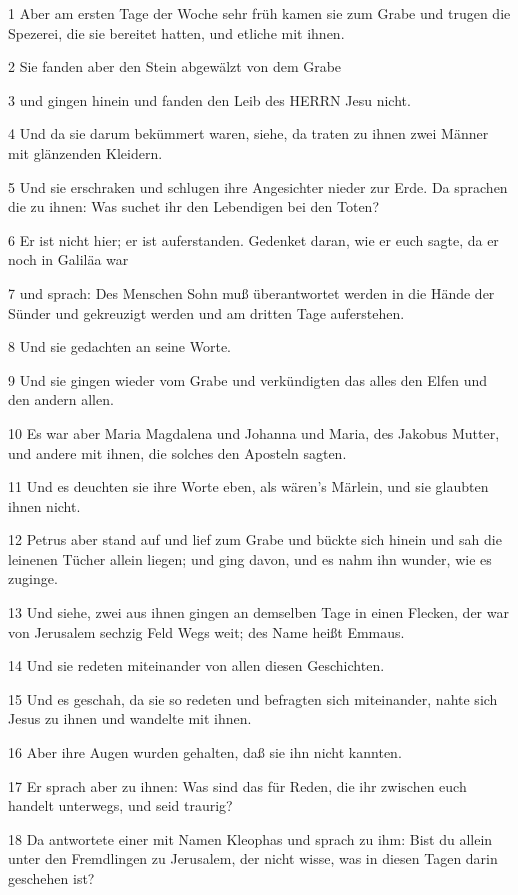 \par 1 Aber am ersten Tage der Woche sehr früh kamen sie zum Grabe und trugen die Spezerei, die sie bereitet hatten, und etliche mit ihnen.
\par 2 Sie fanden aber den Stein abgewälzt von dem Grabe
\par 3 und gingen hinein und fanden den Leib des HERRN Jesu nicht.
\par 4 Und da sie darum bekümmert waren, siehe, da traten zu ihnen zwei Männer mit glänzenden Kleidern.
\par 5 Und sie erschraken und schlugen ihre Angesichter nieder zur Erde. Da sprachen die zu ihnen: Was suchet ihr den Lebendigen bei den Toten?
\par 6 Er ist nicht hier; er ist auferstanden. Gedenket daran, wie er euch sagte, da er noch in Galiläa war
\par 7 und sprach: Des Menschen Sohn muß überantwortet werden in die Hände der Sünder und gekreuzigt werden und am dritten Tage auferstehen.
\par 8 Und sie gedachten an seine Worte.
\par 9 Und sie gingen wieder vom Grabe und verkündigten das alles den Elfen und den andern allen.
\par 10 Es war aber Maria Magdalena und Johanna und Maria, des Jakobus Mutter, und andere mit ihnen, die solches den Aposteln sagten.
\par 11 Und es deuchten sie ihre Worte eben, als wären's Märlein, und sie glaubten ihnen nicht.
\par 12 Petrus aber stand auf und lief zum Grabe und bückte sich hinein und sah die leinenen Tücher allein liegen; und ging davon, und es nahm ihn wunder, wie es zuginge.
\par 13 Und siehe, zwei aus ihnen gingen an demselben Tage in einen Flecken, der war von Jerusalem sechzig Feld Wegs weit; des Name heißt Emmaus.
\par 14 Und sie redeten miteinander von allen diesen Geschichten.
\par 15 Und es geschah, da sie so redeten und befragten sich miteinander, nahte sich Jesus zu ihnen und wandelte mit ihnen.
\par 16 Aber ihre Augen wurden gehalten, daß sie ihn nicht kannten.
\par 17 Er sprach aber zu ihnen: Was sind das für Reden, die ihr zwischen euch handelt unterwegs, und seid traurig?
\par 18 Da antwortete einer mit Namen Kleophas und sprach zu ihm: Bist du allein unter den Fremdlingen zu Jerusalem, der nicht wisse, was in diesen Tagen darin geschehen ist?
